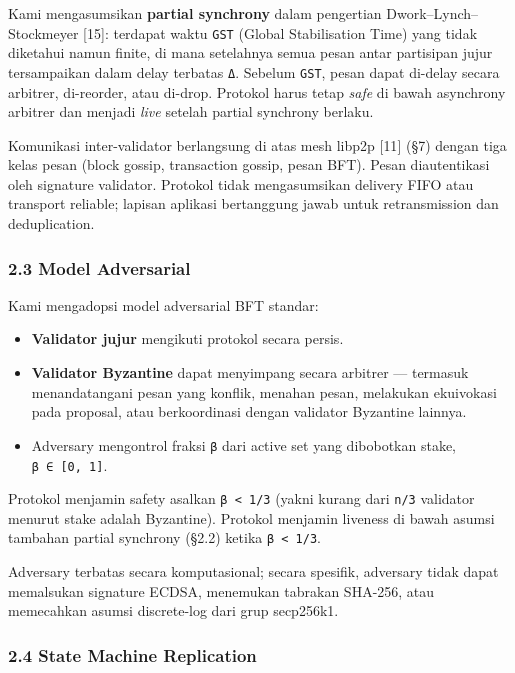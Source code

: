 \documentclass[11pt,a4paper]{article}
\providecommand{\tightlist}{\setlength{\itemsep}{0pt}\setlength{\parskip}{0pt}}
\begin{document}
Kami mengasumsikan \textbf{partial synchrony} dalam pengertian Dwork--Lynch--Stockmeyer {[}15{]}: terdapat waktu \texttt{GST} (Global Stabilisation Time) yang tidak diketahui namun finite, di mana setelahnya semua pesan antar partisipan jujur tersampaikan dalam delay terbatas \texttt{Δ}. Sebelum \texttt{GST}, pesan dapat di-delay secara arbitrer, di-reorder, atau di-drop. Protokol harus tetap \emph{safe} di bawah asynchrony arbitrer dan menjadi \emph{live} setelah partial synchrony berlaku.

Komunikasi inter-validator berlangsung di atas mesh libp2p {[}11{]} (§7) dengan tiga kelas pesan (block gossip, transaction gossip, pesan BFT). Pesan diautentikasi oleh signature validator. Protokol tidak mengasumsikan delivery FIFO atau transport reliable; lapisan aplikasi bertanggung jawab untuk retransmission dan deduplication.

\hypertarget{model-adversarial}{%
\subsubsection{2.3 Model Adversarial}\label{model-adversarial}}

Kami mengadopsi model adversarial BFT standar:

\begin{itemize}
\tightlist
\item
  \textbf{Validator jujur} mengikuti protokol secara persis.
\item
  \textbf{Validator Byzantine} dapat menyimpang secara arbitrer --- termasuk menandatangani pesan yang konflik, menahan pesan, melakukan ekuivokasi pada proposal, atau berkoordinasi dengan validator Byzantine lainnya.
\item
  Adversary mengontrol fraksi \texttt{β} dari active set yang dibobotkan stake, \texttt{β\ ∈\ {[}0,\ 1{]}}.
\end{itemize}

Protokol menjamin safety asalkan \texttt{β\ \textless{}\ 1/3} (yakni kurang dari \texttt{n/3} validator menurut stake adalah Byzantine). Protokol menjamin liveness di bawah asumsi tambahan partial synchrony (§2.2) ketika \texttt{β\ \textless{}\ 1/3}.

Adversary terbatas secara komputasional; secara spesifik, adversary tidak dapat memalsukan signature ECDSA, menemukan tabrakan SHA-256, atau memecahkan asumsi discrete-log dari grup secp256k1.

\hypertarget{state-machine-replication}{%
\subsubsection{2.4 State Machine Replication}\label{state-machine-replication}}
\end{document}
